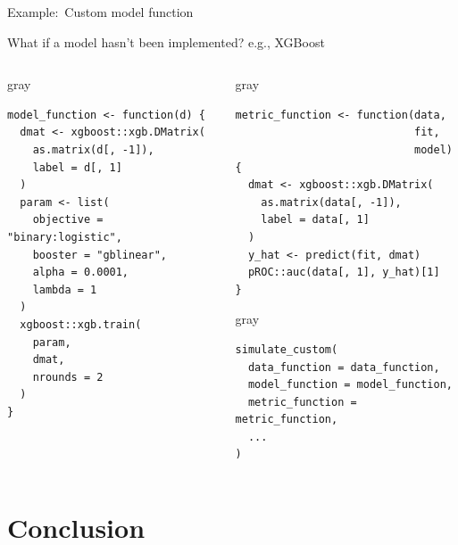 \documentclass[11pt]{beamer}
\begin{document}

\begin{frame}[c,fragile]{Example:\ Custom model function}

	What if a model hasn't been implemented? e.g., XGBoost \vspace{-0.5em}%

	\begin{columns}
		\begin{column}[T]{0.5\textwidth}
			\begin{cbox}{gray}{}%
				\begin{verbatim}
model_function <- function(d) {
  dmat <- xgboost::xgb.DMatrix(
    as.matrix(d[, -1]),
    label = d[, 1]
  )
  param <- list(
    objective = "binary:logistic",
    booster = "gblinear",
    alpha = 0.0001,
    lambda = 1
  )
  xgboost::xgb.train(
    param,
    dmat,
    nrounds = 2
  )
}
            \end{verbatim}
			\end{cbox}

		\end{column}
		\begin{column}[T]{0.55\textwidth}
			\begin{cbox}{gray}{}%
				\begin{verbatim}
metric_function <- function(data,
                            fit,
                            model) {
  dmat <- xgboost::xgb.DMatrix(
    as.matrix(data[, -1]), 
    label = data[, 1]
  )
  y_hat <- predict(fit, dmat)
  pROC::auc(data[, 1], y_hat)[1]
}
            \end{verbatim}
			\end{cbox}

			\begin{cbox}{gray}{}%
				\begin{verbatim}
simulate_custom(
  data_function = data_function,
  model_function = model_function,
  metric_function = metric_function,
  ...
)
            \end{verbatim}
			\end{cbox}
		\end{column}
	\end{columns}

\end{frame}

\section{Conclusion}
\end{document}

